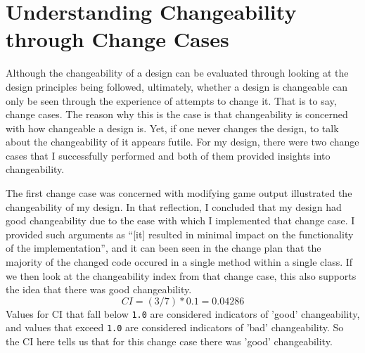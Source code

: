 \documentclass[10pt, a4paper, conference]{IEEEtran}
\begin{document}
\section{Understanding Changeability through Change Cases}
Although the changeability of a design can be evaluated through looking at the
design principles being followed, ultimately, whether a design is changeable
can only be seen through the experience of attempts to change it. That is to
say, change cases. The reason why this is the case is that changeability is
concerned with how changeable a design is. Yet, if one never changes the
design, to talk about the changeability of it appears futile. For my design, 
there were two change cases that I successfully performed and both of them 
provided insights into changeability.

The first change case was concerned with modifying game output
\cite{a4-change-case} illustrated the changeability of my design. In that
reflection, I concluded that my design had good changeability due to the ease
with which I implemented that change case. I provided such arguments as ``[it]
resulted in minimal impact on the functionality of the implementation'', and it
can been seen in the change plan that the majority of the changed code occured
in a single method within a single class. If we then look at the changeability
index from that change case, this also supports the idea that there was good
changeability.
\begin{equation}
  CI = (3 / 7) * 0.1 = 0.04286
\end{equation}
Values for CI that fall below \texttt{1.0} are considered indicators of 'good'
changeability, and values that exceed \texttt{1.0} are considered indicators of
'bad' changeability. So the CI here tells us that for this change case there
was 'good' changeability. 
\end{document}
